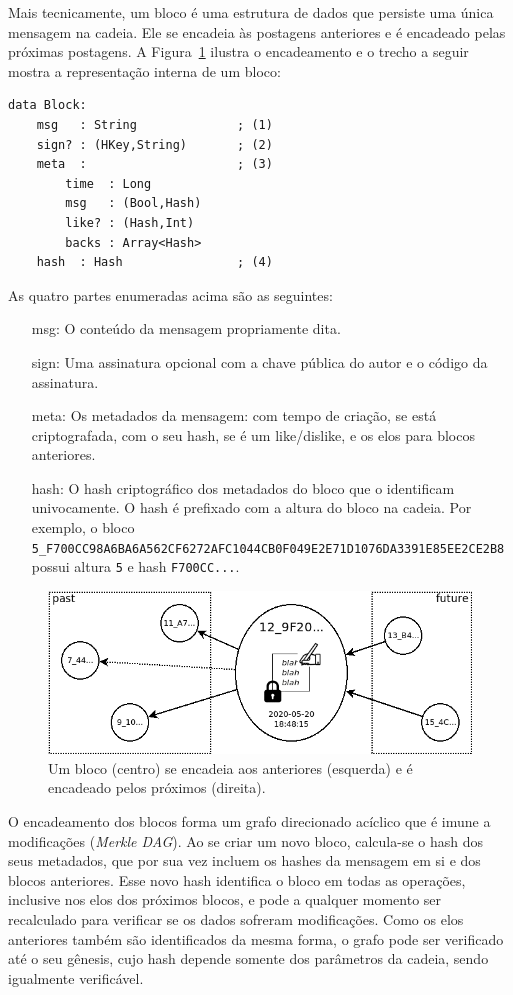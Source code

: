 \documentclass[12pt]{article}
\begin{document}
Mais tecnicamente, um bloco é uma estrutura de dados que persiste uma única
mensagem na cadeia.
Ele se encadeia às postagens anteriores e é encadeado pelas próximas postagens.
A Figura~\ref{fig.block} ilustra o encadeamento e o trecho a seguir mostra a
representação interna de um bloco:
%
{\footnotesize
\begin{verbatim}
data Block:
    msg   : String              ; (1)
    sign? : (HKey,String)       ; (2)
    meta  :                     ; (3)
        time  : Long
        msg   : (Bool,Hash)
        like? : (Hash,Int)
        backs : Array<Hash>
    hash  : Hash                ; (4)
\end{verbatim}
}
%
As quatro partes enumeradas acima são as seguintes:
%
\begin{enumerate}
\item[msg:]  O conteúdo da mensagem propriamente dita.
\item[sign:] Uma assinatura opcional com a chave pública do autor e o código da
             assinatura.
\item[meta:] Os metadados da mensagem: com tempo de criação, se está
             criptografada, com o seu hash, se é um like/dislike, e os elos
             para blocos anteriores.
\item[hash:] O hash criptográfico dos metadados do bloco que o identificam
             univocamente. O hash é prefixado com a altura do bloco na cadeia.
             Por exemplo, o bloco
                {\scriptsize\texttt{5\_F700CC98A6BA6A562CF6272AFC1044CB0F049E2E71D1076DA3391E85EE2CE2B8}}
             possui altura \texttt{5} e hash \texttt{F700CC...}.
\end{enumerate}

\begin{figure}[ht]
\centering
\includegraphics[width=.75\textwidth]{block.png}
\caption{Um bloco (centro) se encadeia aos anteriores (esquerda) e é encadeado
         pelos próximos (direita).}
\label{fig.block}
\end{figure}

O encadeamento dos blocos forma um grafo direcionado acíclico que é imune a
modificações (\emph{Merkle DAG}).
Ao se criar um novo bloco, calcula-se o hash dos seus metadados, que por sua
vez incluem os hashes da mensagem em si e dos blocos anteriores.
Esse novo hash identifica o bloco em todas as operações, inclusive nos elos dos
próximos blocos, e pode a qualquer momento ser recalculado para verificar se os
dados sofreram modificações.
Como os elos anteriores também são identificados da mesma forma, o grafo pode
ser verificado até o seu gênesis, cujo hash depende somente dos parâmetros da
cadeia, sendo igualmente verificável.
\end{document}
